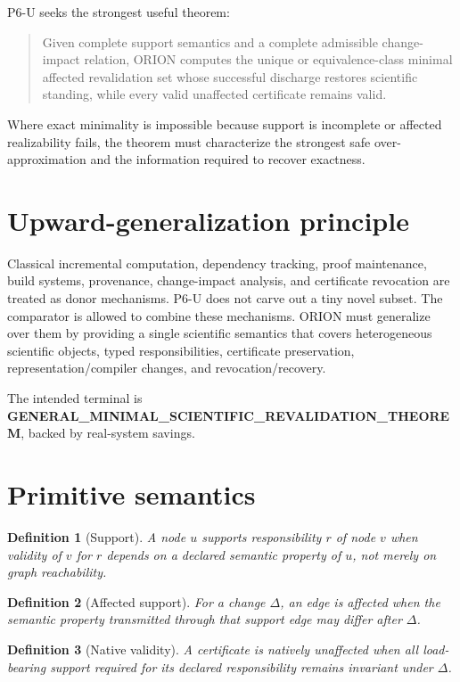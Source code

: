 \documentclass[11pt]{article}
\newtheorem{definition}{Definition}
\begin{document}
P6-U seeks the strongest useful theorem:
\begin{quote}
Given complete support semantics and a complete admissible change-impact relation, ORION computes the unique or equivalence-class minimal affected revalidation set whose successful discharge restores scientific standing, while every valid unaffected certificate remains valid.
\end{quote}

Where exact minimality is impossible because support is incomplete or affected realizability fails, the theorem must characterize the strongest safe over-approximation and the information required to recover exactness.

\section{Upward-generalization principle}
Classical incremental computation, dependency tracking, proof maintenance, build systems, provenance, change-impact analysis, and certificate revocation are treated as donor mechanisms. P6-U does not carve out a tiny novel subset. The comparator is allowed to combine these mechanisms. ORION must generalize over them by providing a single scientific semantics that covers heterogeneous scientific objects, typed responsibilities, certificate preservation, representation/compiler changes, and revocation/recovery.

The intended terminal is \textbf{GENERAL_MINIMAL_SCIENTIFIC_REVALIDATION_THEOREM}, backed by real-system savings.

\section{Primitive semantics}
\begin{definition}[Support]
A node $u$ supports responsibility $r$ of node $v$ when validity of $v$ for $r$ depends on a declared semantic property of $u$, not merely on graph reachability.
\end{definition}

\begin{definition}[Affected support]
For a change $\Delta$, an edge is affected when the semantic property transmitted through that support edge may differ after $\Delta$.
\end{definition}

\begin{definition}[Native validity]
A certificate is natively unaffected when all load-bearing support required for its declared responsibility remains invariant under $\Delta$.
\end{definition}
\end{document}
